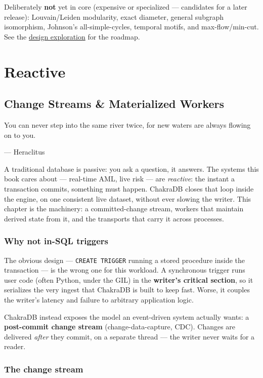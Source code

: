 \documentclass[
  11pt,
  openany]{book}
\begin{document}
Deliberately \textbf{not} yet in core (expensive or specialized ---
candidates for a later release): Louvain/Leiden modularity, exact
diameter, general subgraph isomorphism, Johnson's all-simple-cycles,
temporal motifs, and max-flow/min-cut. See the
\href{../../../graph-exploration.md}{design exploration} for the
roadmap.

\part{Reactive}

\chapter{Change Streams \& Materialized
Workers}\label{change-streams-materialized-workers}

\epigraph{You can never step into the same river twice, for new waters are always flowing on to you.}{--- Heraclitus}

A traditional database is passive: you ask a question, it answers. The
systems this book cares about --- real-time AML, live risk --- are
\emph{reactive}: the instant a transaction commits, something must
happen. ChakraDB closes that loop inside the engine, on one consistent
live dataset, without ever slowing the writer. This chapter is the
machinery: a committed-change stream, workers that maintain derived
state from it, and the transports that carry it across processes.

\section{Why not in-SQL triggers}\label{why-not-in-sql-triggers}

The obvious design --- \texttt{CREATE\ TRIGGER} running a stored
procedure inside the transaction --- is the wrong one for this workload.
A synchronous trigger runs user code (often Python, under the GIL) in
the \textbf{writer's critical section}, so it serializes the very ingest
that ChakraDB is built to keep fast. Worse, it couples the writer's
latency and failure to arbitrary application logic.

ChakraDB instead exposes the model an event-driven system actually
wants: a \textbf{post-commit change stream} (change-data-capture, CDC).
Changes are delivered \emph{after} they commit, on a separate thread ---
the writer never waits for a reader.

\section{The change stream}\label{the-change-stream}
\end{document}
